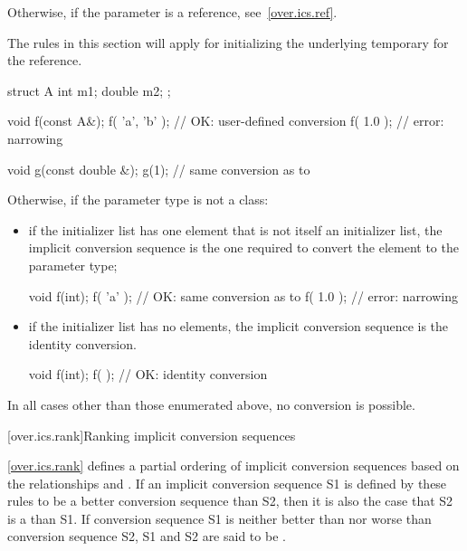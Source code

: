 \pnum
Otherwise, if the parameter is a reference, see~\ref{over.ics.ref}. \begin{note}
The rules in this section will apply for initializing the underlying temporary
for the reference. \end{note} \begin{example}
\begin{codeblock}
struct A {
  int m1;
  double m2;
};

void f(const A&);
f( {'a', 'b'} );            // OK:  user-defined conversion 
f( {1.0} );                 // error: narrowing

void g(const double &);
g({1});                     // same conversion as  to 
\end{codeblock}
\end{example}

\pnum
Otherwise, if the parameter type is not a class:

\begin{itemize}
\item if the initializer list has one element that is not itself an initializer list,
the implicit conversion sequence is the one required to convert the element to
the parameter type; \begin{example}
\begin{codeblock}
void f(int);
f( {'a'} );                 // OK: same conversion as  to 
f( {1.0} );                 // error: narrowing
\end{codeblock}
\end{example}

\item if the initializer list has no elements, the implicit conversion sequence
is the identity conversion. \begin{example}
\begin{codeblock}
void f(int);
f( { } );                   // OK: identity conversion 
\end{codeblock}
\end{example}
\end{itemize}

\pnum
In all cases other than those enumerated above, no conversion is possible.

[over.ics.rank]{Ranking implicit conversion sequences}

\pnum
\ref{over.ics.rank} defines a partial ordering of implicit conversion
sequences based on the relationships
and
.
If an implicit conversion sequence S1 is
defined by these rules to be a better conversion sequence than
S2, then it is also the case that S2 is a
than S1.
If conversion sequence S1 is neither better
than nor worse than conversion sequence S2, S1 and S2 are said to
be
.

